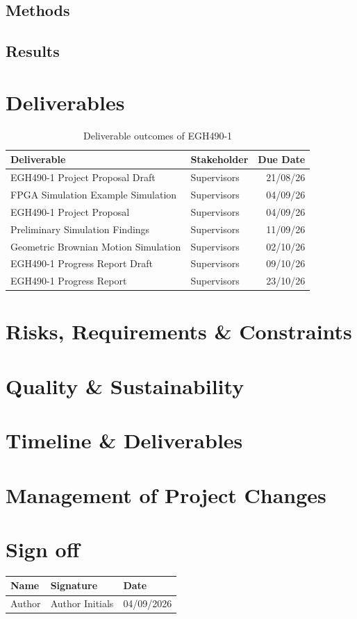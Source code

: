 \documentclass[11pt, a4paper]{article}
\begin{document}
	\subsection{Methods}
	
	\subsection{Results}
	
	\section{Deliverables}
	
	\begin{table}[h!]
		\begin{tabularx}{\textwidth}{|X|X|r|}\hline
			Deliverable & Stakeholder & Due Date\\\hline
			EGH490-1 Project Proposal Draft & Supervisors & 21/08/26\\
			FPGA Simulation Example Simulation & Supervisors & 04/09/26\\
			EGH490-1 Project Proposal & Supervisors & 04/09/26\\
			Preliminary Simulation Findings & Supervisors & 11/09/26\\
			Geometric Brownian Motion Simulation & Supervisors & 02/10/26\\
			EGH490-1 Progress Report Draft & Supervisors & 09/10/26\\
			EGH490-1 Progress Report & Supervisors & 23/10/26\\\hline
		\end{tabularx}	
		\caption{Deliverable outcomes of EGH490-1}
	\end{table}
	
	\section{Risks, Requirements \& Constraints}
	
	\section{Quality \& Sustainability}
	
	\section{Timeline \& Deliverables}
	
	\section{Management of Project Changes}
	
	\vfill
	\section*{Sign off}
	\begin{tabularx}{\textwidth}{X|X|X}
	Name & Signature & Date \\\hline
	Author & Author Initials & 04/09/2026\\\hline
	\end{tabularx}
	\vspace{5mm}
	\appendix
	\newpage
    \printbibliography
\end{document}
